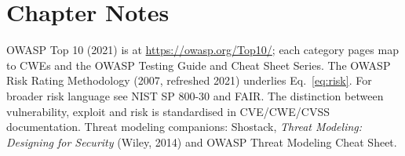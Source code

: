 \section*{Chapter Notes}
OWASP Top 10 (2021) is at \url{https://owasp.org/Top10/}; each category pages map to CWEs and the OWASP Testing Guide and Cheat Sheet Series. The OWASP Risk Rating Methodology (2007, refreshed 2021) underlies Eq.~\ref{eq:risk}. For broader risk language see NIST SP 800-30 and FAIR. The distinction between vulnerability, exploit and risk is standardised in CVE/CWE/CVSS documentation. Threat modeling companions: Shostack, \emph{Threat Modeling: Designing for Security} (Wiley, 2014) and OWASP Threat Modeling Cheat Sheet.
